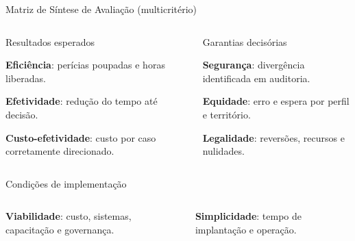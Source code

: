 \documentclass[presentation,aspectratio=169]{beamer}
\begin{document}
\begin{frame}[t]{Matriz de Síntese de Avaliação (multicritério)}
\begin{columns}[T,onlytextwidth]
\begin{block}{Resultados esperados}
\begin{minipage}[t][1.92cm][t]{\linewidth}\raggedright\small
\textbf{Eficiência}: perícias poupadas e horas liberadas.\par\vspace{0.34em}
\textbf{Efetividade}: redução do tempo até decisão.\par\vspace{0.34em}
\textbf{Custo-efetividade}: custo por caso corretamente direcionado.
\end{minipage}
\end{block}
\begin{block}{Garantias decisórias}
\begin{minipage}[t][1.92cm][t]{\linewidth}\raggedright\small
\textbf{Segurança}: divergência identificada em auditoria.\par\vspace{0.34em}
\textbf{Equidade}: erro e espera por perfil e território.\par\vspace{0.34em}
\textbf{Legalidade}: reversões, recursos e nulidades.
\end{minipage}
\end{block}
\end{columns}
\vspace{0.28cm}
\begin{block}{Condições de implementação}\small
\begin{columns}[T,onlytextwidth]
\raggedright
\textbf{Viabilidade}: custo, sistemas, capacitação e governança.
\raggedright
\textbf{Simplicidade}: tempo de implantação e operação.
\end{columns}
\end{block}
\vspace{0.26cm}
\end{frame}
\end{document}
